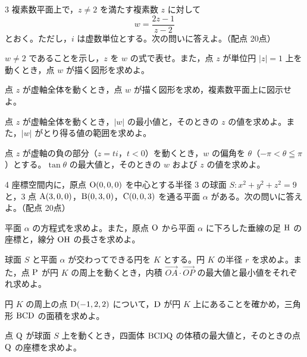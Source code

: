 \begin{monsheet}
\begin{daimon}{3}
複素数平面上で，$z\neq 2$ を満たす複素数 $z$ に対して
\[
  w = \frac{2z-1}{z-2}
\]
とおく。ただし，$i$ は虚数単位とする。次の問いに答えよ。\hfill（配点 20点）
\begin{shomon}
  \item $w\neq 2$ であることを示し，$z$ を $w$ の式で表せ。また，点 $z$ が単位円 $|z|=1$ 上を動くとき，点 $w$ が描く図形を求めよ。
  \item 点 $z$ が虚軸全体を動くとき，点 $w$ が描く図形を求め，複素数平面上に図示せよ。
  \item 点 $z$ が虚軸全体を動くとき，$|w|$ の最小値と，そのときの $z$ の値を求めよ。また，$|w|$ がとり得る値の範囲を求めよ。
  \item 点 $z$ が虚軸の負の部分（$z=ti$，$t<0$）を動くとき，$w$ の偏角を $\theta$（$-\pi<\theta\leqq\pi$）とする。$\tan\theta$ の最大値と，そのときの $w$ および $z$ の値を求めよ。
\end{shomon}
\end{daimon}

\clearpage

\begin{daimon}{4}
座標空間内に，原点 $\mathrm{O}(0, 0, 0)$ を中心とする半径 $3$ の球面 $S: x^{2}+y^{2}+z^{2}=9$ と，$3$ 点 $\mathrm{A}(3, 0, 0)$，$\mathrm{B}(0, 3, 0)$，$\mathrm{C}(0, 0, 3)$ を通る平面 $\alpha$ がある。次の問いに答えよ。\hfill（配点 20点）
\begin{shomon}
  \item 平面 $\alpha$ の方程式を求めよ。また，原点 $\mathrm{O}$ から平面 $\alpha$ に下ろした垂線の足 $\mathrm{H}$ の座標と，線分 $\mathrm{OH}$ の長さを求めよ。
  \item 球面 $S$ と平面 $\alpha$ が交わってできる円を $K$ とする。円 $K$ の半径 $r$ を求めよ。また，点 $\mathrm{P}$ が円 $K$ の周上を動くとき，内積 $\Vec{OA}\cdot\Vec{OP}$ の最大値と最小値をそれぞれ求めよ。
  \item 円 $K$ の周上の点 $\mathrm{D}(-1, 2, 2)$ について，$\mathrm{D}$ が円 $K$ 上にあることを確かめ，三角形 $\mathrm{BCD}$ の面積を求めよ。
  \item 点 $\mathrm{Q}$ が球面 $S$ 上を動くとき，四面体 $\mathrm{BCDQ}$ の体積の最大値と，そのときの点 $\mathrm{Q}$ の座標を求めよ。
\end{shomon}
\end{daimon}


\end{monsheet}
